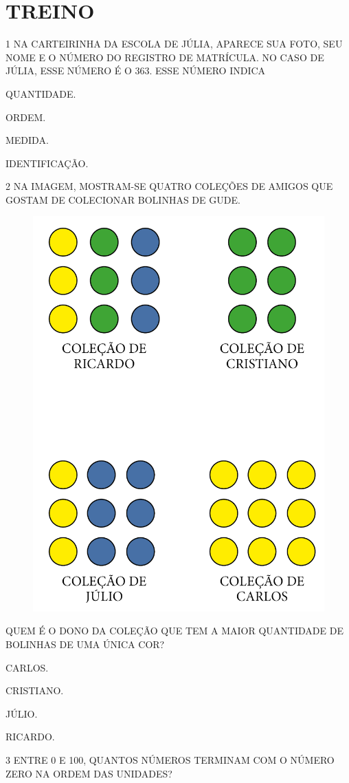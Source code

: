\section*{TREINO}

\num{1} NA CARTEIRINHA DA ESCOLA DE JÚLIA, APARECE SUA FOTO, SEU NOME E O NÚMERO DO
REGISTRO DE MATRÍCULA. NO CASO DE JÚLIA, ESSE NÚMERO É O 363. ESSE NÚMERO INDICA

\begin{escolha}
\item
  QUANTIDADE.
\item
  ORDEM.
\item
  MEDIDA.
\item
  IDENTIFICAÇÃO.
\end{escolha}

\num{2} NA IMAGEM, MOSTRAM-SE QUATRO COLEÇÕES DE AMIGOS QUE GOSTAM DE COLECIONAR
BOLINHAS DE GUDE.

\begin{figure}[H]
\centering
\includegraphics[width=.5\textwidth]{./media/SAEB_1ANO_MAT_FIGURA16.png}
\end{figure}

\noindent{}QUEM É O DONO DA COLEÇÃO QUE TEM A MAIOR QUANTIDADE DE BOLINHAS DE UMA ÚNICA COR?

\begin{escolha}
\item
  CARLOS.
\item
  CRISTIANO.
\item
  JÚLIO.
\item
  RICARDO.
\end{escolha}

\num{3} ENTRE 0 E 100, QUANTOS NÚMEROS TERMINAM COM O NÚMERO ZERO NA ORDEM DAS UNIDADES?

